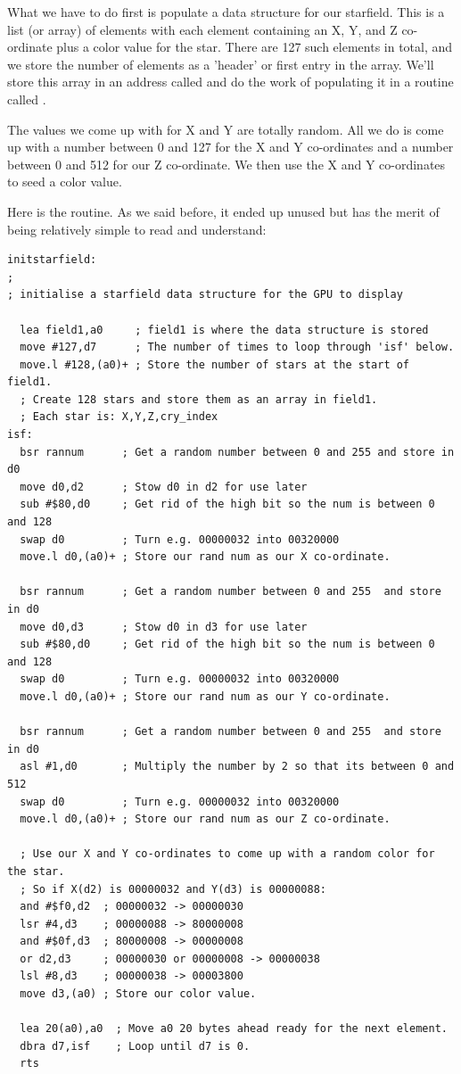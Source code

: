 What we have to do first is populate a data structure for our starfield. This is a list (or array) of elements with each element containing an X, Y,
and Z co-ordinate plus a color value for the star. There are 127 such elements in total, and we store the number of elements as a 'header' or first entry
in the array. We'll store this array in an address called  and do the work of populating it in a routine called .

The values we come up with for X and Y are totally random. All we do is come up with a number between
0 and 127 for the X and Y co-ordinates and a number between 0 and 512 for our Z co-ordinate. We then use the X and Y co-ordinates
to seed a color value.

Here is the routine. As we said before, it ended up unused but has the merit of being relatively simple to read and understand:
\begin{lstlisting}[caption=Populating an unused starfield data structure. This is a fuzzier version of the ring starfield used in the credits screen.]
initstarfield:
;
; initialise a starfield data structure for the GPU to display

  lea field1,a0     ; field1 is where the data structure is stored
  move #127,d7      ; The number of times to loop through 'isf' below.
  move.l #128,(a0)+ ; Store the number of stars at the start of field1.
  ; Create 128 stars and store them as an array in field1.
  ; Each star is: X,Y,Z,cry_index
isf:
  bsr rannum      ; Get a random number between 0 and 255 and store in d0
  move d0,d2      ; Stow d0 in d2 for use later
  sub #$80,d0     ; Get rid of the high bit so the num is between 0 and 128
  swap d0         ; Turn e.g. 00000032 into 00320000
  move.l d0,(a0)+ ; Store our rand num as our X co-ordinate.

  bsr rannum      ; Get a random number between 0 and 255  and store in d0
  move d0,d3      ; Stow d0 in d3 for use later
  sub #$80,d0     ; Get rid of the high bit so the num is between 0 and 128
  swap d0         ; Turn e.g. 00000032 into 00320000
  move.l d0,(a0)+ ; Store our rand num as our Y co-ordinate.

  bsr rannum      ; Get a random number between 0 and 255  and store in d0
  asl #1,d0       ; Multiply the number by 2 so that its between 0 and 512
  swap d0         ; Turn e.g. 00000032 into 00320000
  move.l d0,(a0)+ ; Store our rand num as our Z co-ordinate.

  ; Use our X and Y co-ordinates to come up with a random color for the star.
  ; So if X(d2) is 00000032 and Y(d3) is 00000088:
  and #$f0,d2  ; 00000032 -> 00000030
  lsr #4,d3    ; 00000088 -> 80000008
  and #$0f,d3  ; 80000008 -> 00000008
  or d2,d3     ; 00000030 or 00000008 -> 00000038
  lsl #8,d3    ; 00000038 -> 00003800
  move d3,(a0) ; Store our color value.

  lea 20(a0),a0  ; Move a0 20 bytes ahead ready for the next element.
  dbra d7,isf    ; Loop until d7 is 0.
  rts
\end{lstlisting}

